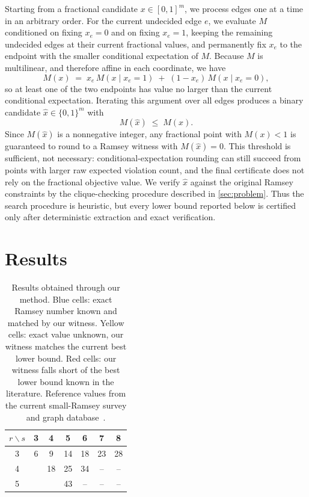 \documentclass{article}
\begin{document}
Starting from a fractional candidate $x \in [0,1]^m$, we process edges one at a time in an arbitrary order. For the current undecided edge $e$, we evaluate $M$ conditioned on fixing $x_e=0$ and on fixing $x_e=1$, keeping the remaining undecided edges at their current fractional values, and permanently fix $x_e$ to the endpoint with the smaller conditional expectation of $M$. Because $M$ is multilinear, and therefore affine in each coordinate, we have
\[
    M(x) \;=\; x_e\, M(x \mid x_e = 1) \;+\; (1-x_e)\, M(x \mid x_e = 0),
\]
so at least one of the two endpoints has value no larger than the current conditional expectation. Iterating this argument over all edges produces a binary candidate $\widehat{x} \in \{0,1\}^m$ with
\[
    M(\widehat{x}) \;\leq\; M(x).
\]
Since $M(\widehat{x})$ is a nonnegative integer, any fractional point with $M(x) < 1$ is guaranteed to round to a Ramsey witness with $M(\widehat{x}) = 0$. This threshold is sufficient, not necessary: conditional-expectation rounding can still succeed from points with larger raw expected violation count, and the final certificate does not rely on the fractional objective value. We verify $\widehat{x}$ against the original Ramsey constraints by the clique-checking procedure described in \cref{sec:problem}. Thus the search procedure is heuristic, but every lower bound reported below is certified only after deterministic extraction and exact verification.

\section{Results}


\begin{table}[ht]
    \centering
    \normalsize
    \setlength{\tabcolsep}{8pt}
    \renewcommand{\arraystretch}{1.3}
    \caption{Results obtained through our method. Blue cells: exact Ramsey number known and matched by our witness. Yellow cells: exact value unknown, our witness matches the current best lower bound. Red cells: our witness falls short of the best lower bound known in the literature. Reference values from the current small-Ramsey survey and graph database~\cite{radziszowski2026smallramsey,mckayramseydata}.}
    \label{tab:small-ramsey-grid}
    \begin{tabular}{c|cccccc}
      $r \backslash s$ & 3 & 4 & 5 & 6 & 7 & 8 \\
      \hline
      3 & \cellcolor{cellblue}6 & \cellcolor{cellblue}9 & \cellcolor{cellblue}14 & \cellcolor{cellblue}18 & \cellcolor{cellblue}23 & \cellcolor{cellblue}28 \\
      4 &  & \cellcolor{cellblue}18 & \cellcolor{cellblue}25 & \cellcolor{cellorange}34 & \cellcolor{cellgray}-- & \cellcolor{cellgray}-- \\
      5 &  &  & \cellcolor{cellyellow}43 & \cellcolor{cellgray}-- & \cellcolor{cellgray}-- & \cellcolor{cellgray}-- \\
    \end{tabular}
  \end{table}
\end{document}
